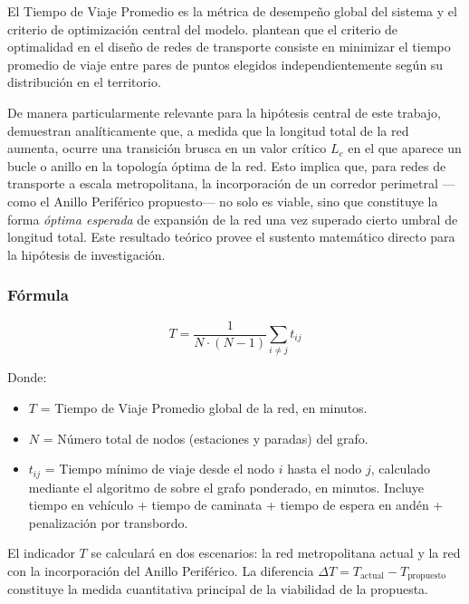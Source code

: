 El Tiempo de Viaje Promedio es la métrica de desempeño global del sistema y el
criterio de optimización central del modelo. \citet{aldous2019optimal}
plantean
que el criterio de optimalidad en el diseño de redes de transporte consiste en
minimizar el tiempo promedio de viaje entre pares de puntos elegidos
independientemente según su distribución en el territorio.
 
De manera particularmente relevante para la hipótesis central de este trabajo,
\citet{aldous2019optimal} demuestran analíticamente que, a medida que la
longitud total de la red aumenta, ocurre una transición brusca en un valor
crítico
$L_c$ en el que aparece un bucle o anillo en la topología óptima de la red. Esto
implica que, para redes de transporte a escala metropolitana, la incorporación
de un
corredor perimetral ---como el Anillo Periférico propuesto--- no solo es viable,
sino
que constituye la forma \textit{óptima esperada} de expansión de la red una vez
superado cierto umbral de longitud total. Este resultado teórico provee el
sustento
matemático directo para la hipótesis de investigación.
 
\subsubsection{Fórmula}
 
\begin{equation}
    T = \frac{1}{N \cdot (N-1)} \sum_{i \neq j} t_{ij}
    \label{eq:tiempo-promedio}
\end{equation}
 
Donde:
\begin{itemize}
    \item $T$ = Tiempo de Viaje Promedio global de la red, en minutos.
    \item $N$ = Número total de nodos (estaciones y paradas) del grafo.
    \item $t_{ij}$ = Tiempo mínimo de viaje desde el nodo $i$ hasta el nodo $j$,
    calculado mediante el algoritmo de \dijkstra{} sobre el grafo ponderado,
    en minutos. Incluye tiempo en vehículo + tiempo de caminata + tiempo de
    espera en andén + penalización por transbordo.
\end{itemize}
 
El indicador $T$ se calculará en dos escenarios: la red metropolitana actual y
la red
con la incorporación del Anillo Periférico. La diferencia
$\Delta T = T_{\text{actual}} - T_{\text{propuesto}}$ constituye la medida
cuantitativa principal de la viabilidad de la propuesta.

